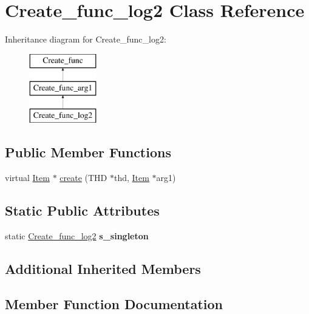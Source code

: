 \hypertarget{classCreate__func__log2}{}\section{Create\+\_\+func\+\_\+log2 Class Reference}
\label{classCreate__func__log2}
Inheritance diagram for Create\+\_\+func\+\_\+log2\+:\begin{figure}[H]
\begin{center}
\leavevmode
\includegraphics[height=3.000000cm]{classCreate__func__log2}
\end{center}
\end{figure}
\subsection*{Public Member Functions}
\begin{DoxyCompactItemize}
\item 
virtual \mbox{\hyperlink{classItem}{Item}} $\ast$ \mbox{\hyperlink{classCreate__func__log2_a449453b19e527f94a1045c997fe628d7}{create}} (T\+HD $\ast$thd, \mbox{\hyperlink{classItem}{Item}} $\ast$arg1)
\end{DoxyCompactItemize}
\subsection*{Static Public Attributes}
\begin{DoxyCompactItemize}
\item 
\mbox{\label{classCreate__func__log2_a2048dd0ab820239fed04f018a431e806}} 
static \mbox{\hyperlink{classCreate__func__log2}{Create\+\_\+func\+\_\+log2}} {\bfseries s\+\_\+singleton}
\end{DoxyCompactItemize}
\subsection*{Additional Inherited Members}


\subsection{Member Function Documentation}
\mbox{\label{classCreate__func__log2_a449453b19e527f94a1045c997fe628d7}} 
